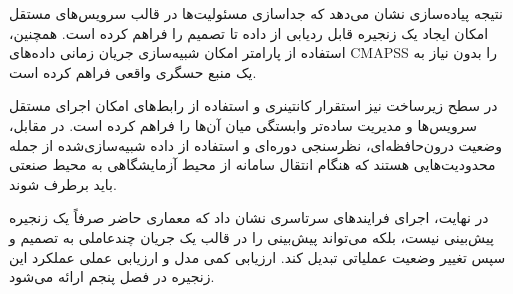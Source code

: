 نتیجه پیاده‌سازی نشان می‌دهد که جداسازی مسئولیت‌ها در قالب سرویس‌های مستقل امکان ایجاد یک زنجیره قابل ردیابی از داده تا تصمیم را فراهم کرده است. همچنین، استفاده از پارامتر  امکان شبیه‌سازی جریان زمانی داده‌های \gls{CMAPSS} را بدون نیاز به یک منبع حسگری واقعی فراهم کرده است.

در سطح زیرساخت نیز استقرار کانتینری و استفاده از رابط‌های  امکان اجرای مستقل سرویس‌ها و مدیریت ساده‌تر وابستگی میان آن‌ها را فراهم کرده است. در مقابل، وضعیت درون‌حافظه‌ای، نظرسنجی دوره‌ای و استفاده از داده شبیه‌سازی‌شده از جمله محدودیت‌هایی هستند که هنگام انتقال سامانه از محیط آزمایشگاهی به محیط صنعتی باید برطرف شوند.

در نهایت، اجرای فرایند‌های سرتاسری نشان داد که معماری حاضر صرفاً یک زنجیره پیش‌بینی نیست، بلکه می‌تواند پیش‌بینی را در قالب یک جریان چندعاملی به تصمیم و سپس تغییر وضعیت عملیاتی تبدیل کند. ارزیابی کمی مدل و ارزیابی عملی عملکرد این زنجیره در فصل پنجم ارائه می‌شود.
